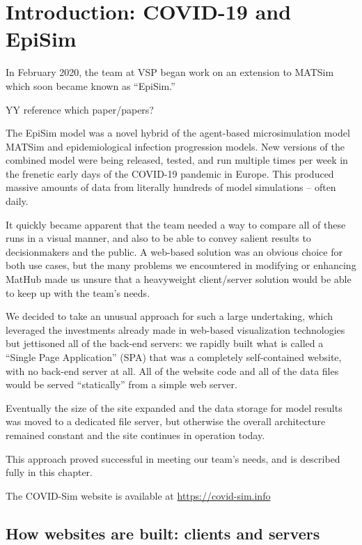 \hypertarget{introduction-covid-19-and-episim}{%
\section{Introduction: COVID-19 and
EpiSim}\label{introduction-covid-19-and-episim}}

In February 2020, the team at VSP began work on an extension to MATSim
which soon became known as ``EpiSim.''

YY reference which paper/papers?

The EpiSim model was a novel hybrid of the agent-based microsimulation
model MATSim and epidemiological infection progression models. New
versions of the combined model were being released, tested, and run
multiple times per week in the frenetic early days of the COVID-19
pandemic in Europe. This produced massive amounts of data from literally
hundreds of model simulations -- often daily.

It quickly became apparent that the team needed a way to compare all of
these runs in a visual manner, and also to be able to convey salient
results to decisionmakers and the public. A web-based solution was an
obvious choice for both use cases, but the many problems we encountered
in modifying or enhancing MatHub made us unsure that a heavyweight
client/server solution would be able to keep up with the team's needs.

We decided to take an unusual approach for such a large undertaking,
which leveraged the investments already made in web-based visualization
technologies but jettisoned all of the back-end servers: we rapidly
built what is called a ``Single Page Application'' (SPA) that was a
completely self-contained website, with no back-end server at all. All
of the website code and all of the data files would be served
``statically'' from a simple web server.

Eventually the size of the site expanded and the data storage for model
results was moved to a dedicated file server, but otherwise the overall
architecture remained constant and the site continues in operation
today.

This approach proved successful in meeting our team's needs, and is
described fully in this chapter.

The COVID-Sim website is available at \url{https://covid-sim.info}

\hypertarget{how-websites-are-built-clients-and-servers}{%
\subsection{How websites are built: clients and
servers}\label{how-websites-are-built-clients-and-servers}}

